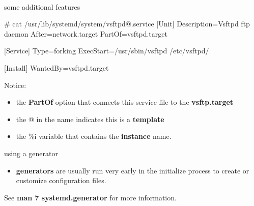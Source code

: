 	\cprotect\note\ {

	
		
	}
		

\begin{frame}
		{some additional features} 

		\begin{raw}
# cat /usr/lib/systemd/system/vsftpd@.service
[Unit]
Description=Vsftpd ftp daemon
After=network.target
PartOf=vsftpd.target

[Service]
Type=forking
ExecStart=/usr/sbin/vsftpd /etc/vsftpd/%

[Install]
WantedBy=vsftpd.target
		\end{raw}

		Notice:
		\begin{itemize}
			\item
		the \textbf{PartOf} option that connects this 
		service file to the \textbf{vsftp.target}
			\item
		the @ in the name indicates this is a \textbf{template} 
			\item
		the \%i variable that contains the \textbf{instance} name.
		\end{itemize}

\end{frame}

	\cprotect\note{
		

	}

\begin{frame}
	{using a generator}
	
	\begin{itemize}
		\item \textbf{generators} are usually run very early in the 
		initialize process to create or customize configuration 
		files.
	\end{itemize}

See \textbf{man 7 systemd.generator} for more information.
	
\end{frame}

